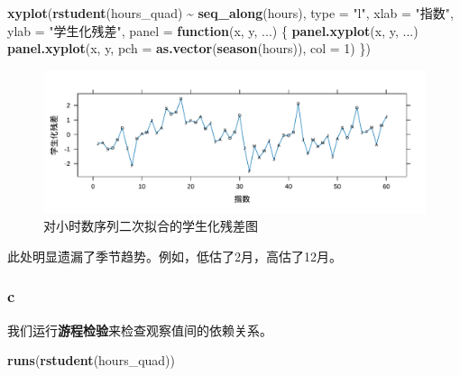 \documentclass[
]{article}
\newenvironment{Shaded}{\begin{snugshade}}{\end{snugshade}}
\newcommand{\AttributeTok}[1]{\textcolor[rgb]{0.13,0.29,0.53}{#1}}
\newcommand{\ControlFlowTok}[1]{\textcolor[rgb]{0.13,0.29,0.53}{\textbf{#1}}}
\newcommand{\DecValTok}[1]{\textcolor[rgb]{0.00,0.00,0.81}{#1}}
\newcommand{\FunctionTok}[1]{\textcolor[rgb]{0.13,0.29,0.53}{\textbf{#1}}}
\newcommand{\NormalTok}[1]{#1}
\newcommand{\SpecialCharTok}[1]{\textcolor[rgb]{0.81,0.36,0.00}{\textbf{#1}}}
\newcommand{\StringTok}[1]{\textcolor[rgb]{0.31,0.60,0.02}{#1}}
\begin{document}
\begin{Shaded}
\begin{Highlighting}[]
\FunctionTok{xyplot}\NormalTok{(}\FunctionTok{rstudent}\NormalTok{(hours\_quad) }\SpecialCharTok{\textasciitilde{}} \FunctionTok{seq\_along}\NormalTok{(hours), }\AttributeTok{type =} \StringTok{"l"}\NormalTok{,}
       \AttributeTok{xlab =} \StringTok{"指数"}\NormalTok{, }\AttributeTok{ylab =} \StringTok{"学生化残差"}\NormalTok{,}
       \AttributeTok{panel =} \ControlFlowTok{function}\NormalTok{(x, y, ...) \{}
         \FunctionTok{panel.xyplot}\NormalTok{(x, y, ...)}
         \FunctionTok{panel.xyplot}\NormalTok{(x, y, }\AttributeTok{pch =} \FunctionTok{as.vector}\NormalTok{(}\FunctionTok{season}\NormalTok{(hours)), }\AttributeTok{col =} \DecValTok{1}\NormalTok{)}
\NormalTok{       \})}
\end{Highlighting}
\end{Shaded}

\begin{figure}
\centering
\includegraphics{chapter3_files/figure-latex/hours-quad-res-1.pdf}
\caption{\label{fig:hours-quad-res}对小时数序列二次拟合的学生化残差图}
\end{figure}

此处明显遗漏了季节趋势。例如，低估了2月，高估了12月。

\hypertarget{c-3}{%
\subsubsection*{c}\label{c-3}}

我们运行\textbf{游程检验}来检查观察值间的依赖关系。

\begin{Shaded}
\begin{Highlighting}[]
\FunctionTok{runs}\NormalTok{(}\FunctionTok{rstudent}\NormalTok{(hours\_quad))}
\end{Highlighting}
\end{Shaded}
\end{document}
